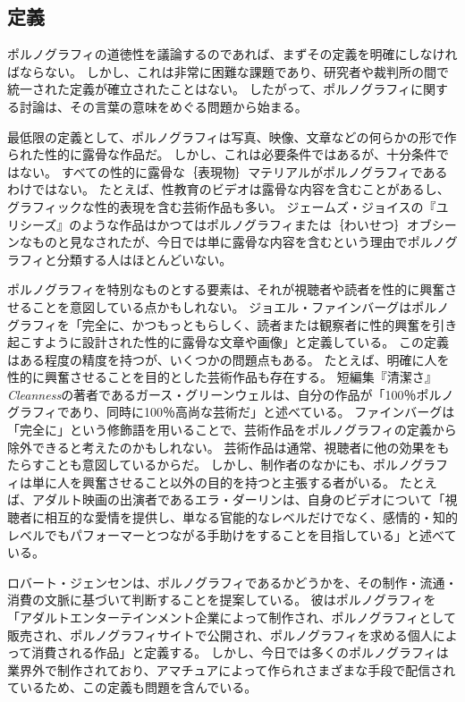\documentclass[paper=a4,book,openany]{jlreq}
\newcommand{\ig}[1]{}           %
\begin{document}
\subsection{定義}

ポルノグラフィの道徳性を議論するのであれば、まずその定義を明確にしなければならない。
しかし、これは非常に困難な課題であり、研究者や裁判所の間で統一された定義が確立されたことはない。
したがって、ポルノグラフィに関する討論は、その言葉の意味をめぐる問題から始まる。

最低限の定義として、ポルノグラフィは写真、映像、文章などの何らかの形で作られた性的に露骨な作品だ。
しかし、これは必要条件ではあるが、十分条件ではない。
すべての性的に露骨な｛表現物｝{マテリアル}がポルノグラフィであるわけではない。
たとえば、性教育のビデオは露骨な内容を含むことがあるし、グラフィックな性的表現を含む芸術作品も多い。
ジェームズ・ジョイスの『ユリシーズ』のような作品はかつてはポルノグラフィまたは｛わいせつ｝{オブシーン}なものと見なされたが、今日では単に露骨な内容を含むという理由でポルノグラフィと分類する人はほとんどいない。

ポルノグラフィを特別なものとする要素は、それが視聴者や読者を性的に興奮させることを意図している点かもしれない。
ジョエル・ファインバーグはポルノグラフィを「完全に、かつもっともらしく、読者または観察者に性的興奮を引き起こすように設計された性的に露骨な文章や画像」と定義している\citep[p.127]{feinberg85:_offen_to_other}。
この定義はある程度の精度を持つが、いくつかの問題点もある。
たとえば、明確に人を性的に興奮させることを目的とした芸術作品も存在する。
短編集『清潔さ』\emph{Cleanness}の著者であるガース・グリーンウェルは、自分の作品が「100％ポルノグラフィであり、同時に100％高尚な芸術だ」と述べている\citep{barone20:_garth_green_comes_clean}。
ファインバーグは「完全に」という修飾語を用いることで、芸術作品をポルノグラフィの定義から除外できると考えたのかもしれない。
芸術作品は通常、視聴者に他の効果をもたらすことも意図しているからだ。
しかし、制作者のなかにも、ポルノグラフィは単に人を興奮させること以外の目的を持つと主張する者がいる。
たとえば、アダルト映画の出演者であるエラ・ダーリン\ig{Ella Darling}は、自身のビデオについて「視聴者に相互的な愛情を提供し、単なる官能的なレベルだけでなく、感情的・知的レベルでもパフォーマーとつながる手助けをすることを目指している」と述べている\citep{bell19:_women_are_leadin_porns_lates_reinv}。
\ig{Ella Darling}

ロバート・ジェンセンは、ポルノグラフィであるかどうかを、その制作・流通・消費の文脈に基づいて判断することを提案している。
彼はポルノグラフィを「アダルトエンターテインメント企業によって制作され、ポルノグラフィとして販売され、ポルノグラフィサイトで公開され、ポルノグラフィを求める個人によって消費される作品」と定義する\citep[p.53]{jensen07:gettingoff}。
しかし、今日では多くのポルノグラフィは業界外で制作されており、アマチュアによって作られさまざまな手段で配信されているため、この定義も問題を含んでいる。
\end{document}

